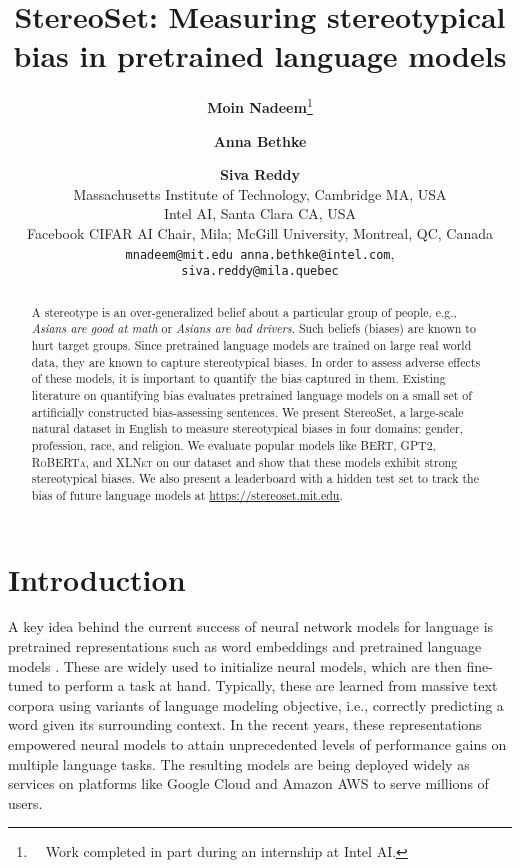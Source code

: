 \documentclass[11pt,a4paper]{article}
\title{StereoSet: Measuring stereotypical bias in pretrained language models}
\author{\textbf{Moin Nadeem}\thanks{\  \ Work completed in part during an internship at Intel AI.} \and \textbf{Anna Bethke} \and \textbf{Siva Reddy} \\
Massachusetts Institute of Technology, Cambridge MA, USA \\
Intel AI, Santa Clara CA, USA\\
Facebook CIFAR AI Chair, Mila; McGill University, Montreal, QC, Canada\\ 
\texttt{mnadeem@mit.edu anna.bethke@intel.com}, \\ 
\texttt{siva.reddy@mila.quebec} \\
}
\newcommand \bert{\textsc{BERT}\xspace}
\newcommand \roberta{\textsc{RoBERTa}\xspace}
\newcommand \xlnet{\textsc{XLNet}\xspace}
\newcommand \gpt{\textsc{GPT2}\xspace}
\begin{document}
\setlength{\abovecaptionskip}{1ex}
\setlength{\belowcaptionskip}{1ex}
\setlength{\floatsep}{1ex}
\setlength{\textfloatsep}{1ex}
\setlength{\abovedisplayskip}{1ex}
\setlength{\belowdisplayskip}{1ex}
\maketitle



\begin{abstract}
A stereotype is an over-generalized belief about a particular group of people, e.g., \textit{Asians are good at math} or \textit{Asians are bad drivers}.
Such beliefs (biases) are known to hurt target groups.
Since pretrained language models are trained on large real world data, they are known to capture stereotypical biases.
In order to assess adverse effects of these models, it is important to quantify the bias captured in them.
Existing literature on quantifying bias evaluates pretrained language models on a small set of artificially constructed bias-assessing sentences.
We present StereoSet, a large-scale natural dataset in English to measure stereotypical biases in four domains: gender, profession, race, and religion.
We evaluate popular models like \bert, \gpt, \roberta, and \xlnet on our dataset and show that these models exhibit strong stereotypical biases.
We also present a leaderboard with a hidden test set to track the bias of future language models at \url{https://stereoset.mit.edu}.
\end{abstract}


\section{Introduction}
A key idea behind the current success of neural network models for language is pretrained representations such as word embeddings \cite{Mikolov2013,pennington2014glove} and pretrained language models \cite{peters_deep_2018,howard_universal_2018,devlin_bert_2019,radford_language_2019,Liu2019}.
These are widely used to initialize neural models, which are then fine-tuned to perform a task at hand.
Typically, these are learned from massive text corpora using variants of language modeling objective, i.e., correctly predicting a word given its surrounding context.
In the recent years,  these representations empowered neural models to attain unprecedented levels of performance gains on multiple language tasks.
The resulting models are being deployed widely as services on platforms like Google Cloud and Amazon AWS to serve millions of users.
\end{document}
